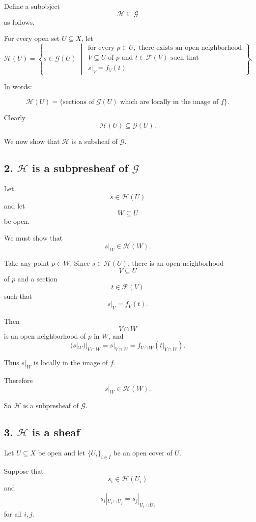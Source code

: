 Define a subobject
\[
\mathcal H \subseteq \mathcal G
\]
as follows.

For every open set $U \subseteq X$, let
\[
\mathcal H(U)
=
\left\{
s \in \mathcal G(U)
\ \middle|\
\begin{array}{l}
	\text{for every } p \in U, \text{ there exists an open neighborhood}
	\\
	V \subseteq U \text{ of } p
	\text{ and } t \in \mathcal F(V)
	\text{ such that}
	\\
	s|_V = f_V(t)
\end{array}
\right\}.
\]

In words:

\[
\mathcal H(U)
=
\{\text{sections of } \mathcal G(U)
\text{ which are locally in the image of } f\}.
\]

Clearly
\[
\mathcal H(U) \subseteq \mathcal G(U).
\]

We now show that $\mathcal H$ is a subsheaf of $\mathcal G$.

\subsection*{2. $\mathcal H$ is a subpresheaf of $\mathcal G$}

Let
\[
s \in \mathcal H(U)
\]
and let
\[
W \subseteq U
\]
be open.

We must show that
\[
s|_W \in \mathcal H(W).
\]

Take any point $p \in W$.
Since $s \in \mathcal H(U)$, there is an open neighborhood
\[
V \subseteq U
\]
of $p$ and a section
\[
t \in \mathcal F(V)
\]
such that
\[
s|_V = f_V(t).
\]

Then
\[
V \cap W
\]
is an open neighborhood of $p$ in $W$, and
\[
(s|_W)|_{V \cap W}
=
s|_{V \cap W}
=
f_{V \cap W}(t|_{V \cap W}).
\]

Thus $s|_W$ is locally in the image of $f$.

Therefore
\[
s|_W \in \mathcal H(W).
\]

So $\mathcal H$ is a subpresheaf of $\mathcal G$.

\subsection*{3. $\mathcal H$ is a sheaf}

Let $U \subseteq X$ be open and let $\{U_i\}_{i \in I}$ be an open cover of $U$.

Suppose that
\[
s_i \in \mathcal H(U_i)
\]
and
\[
s_i|_{U_i \cap U_j}
=
s_j|_{U_i \cap U_j}
\]
for all $i,j$.

